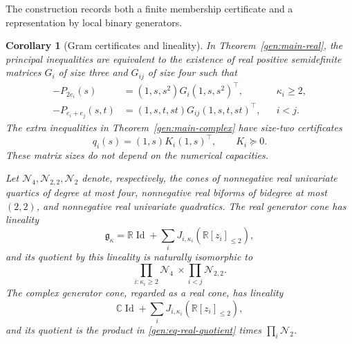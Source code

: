 \documentclass[reqno]{amsart}
\newtheorem{corollary}[theorem]{Corollary}
\theoremstyle{definition}
\theoremstyle{remark}
\newcommand{\C}{\mathbb C}
\newcommand{\R}{\mathbb R}
\DeclareMathOperator{\Id}{Id}
\begin{document}
The construction records both a finite membership certificate
and a representation by local binary generators.

\begin{corollary}[Gram certificates and lineality]
\label{gen:gram-cones}
In Theorem~\ref{gen:main-real}, the principal inequalities are
equivalent to the existence of real positive semidefinite matrices
\(G_i\) of size three and \(G_{ij}\) of size four such that
\begin{align}
 -P_{2e_i}(s)
  &=(1,s,s^2)G_i(1,s,s^2)^{\top},
  &&\kappa_i\geq2,
 \label{gen:eq-gram-unary}\\
 -P_{e_i+e_j}(s,t)
  &=(1,s,t,st)G_{ij}(1,s,t,st)^{\top},
  &&i<j.
 \label{gen:eq-gram-pair}
\end{align}
The extra inequalities in Theorem~\ref{gen:main-complex} have
size-two certificates
\begin{equation}
 q_i(s)=(1,s)K_i(1,s)^{\top},\qquad K_i\succeq0.
 \label{gen:eq-gram-imaginary}
\end{equation}
These matrix sizes do not depend on the numerical capacities.

Let \(\mathcal N_4,\mathcal N_{2,2},\mathcal N_2\) denote,
respectively, the cones of nonnegative real univariate quartics
of degree at most four, nonnegative real biforms of bidegree
at most \((2,2)\), and nonnegative real univariate quadratics.
The real generator cone has lineality
\[
 \mathfrak g_\kappa
 =\R\Id+\sum_iJ_{i,\kappa_i}(\R[z_i]_{\leq2}),
\]
and its quotient by this lineality is naturally isomorphic to
\begin{equation}
 \prod_{i:\kappa_i\geq2}\mathcal N_4
 \ \times\!
 \prod_{i<j}\mathcal N_{2,2}.
 \label{gen:eq-real-quotient}
\end{equation}
The complex generator cone, regarded as a real cone, has
lineality
\[
 \C\Id+\sum_iJ_{i,\kappa_i}(\R[z_i]_{\leq2}),
\]
and its quotient is the product in
\eqref{gen:eq-real-quotient} times \(\prod_i\mathcal N_2\).
\end{corollary}
\end{document}
